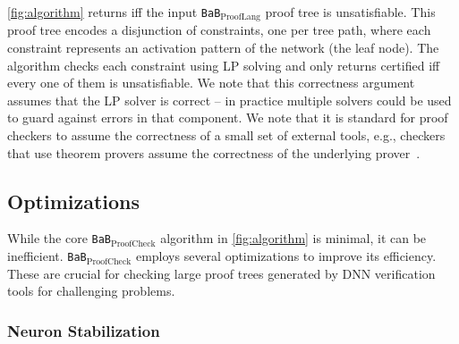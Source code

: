 \documentclass[oneside,11pt,dvipsnames]{book}
\numberwithin{equation}{section}
\theoremstyle{definition}
\theoremstyle{remark}
\newcommand{\prooflang}{\texttt{BaB$_{\text{ProofLang}}$}}
\newcommand{\proofcheck}{\texttt{BaB$_{\text{ProofCheck}}$}}
\begin{document}
 \autoref{fig:algorithm} returns \certified iff the input \prooflang{} proof tree is unsatisfiable. This proof tree encodes a disjunction of constraints, one per tree path, where each constraint represents an activation pattern of the network (the leaf node). The algorithm checks each constraint using LP solving and only returns certified iff every one of them is unsatisfiable.  
We note that this correctness argument assumes that the LP solver is correct -- in practice
multiple solvers could be used to guard against errors in that component.  We note that
it is standard for proof checkers to assume the correctness of a small set of external tools, e.g., checkers that use  theorem provers assume the correctness of the underlying prover~\cite{lammich2023grat}.

\subsection{Optimizations}
While the core \proofcheck{} algorithm in \autoref{fig:algorithm} is minimal, it can be inefficient. \proofcheck{} employs several optimizations to improve its efficiency. These are crucial for checking large proof trees generated by DNN verification tools for challenging problems.


\subsubsection{Neuron Stabilization}\label{sec:neuron-stabelization} 
\end{document}
